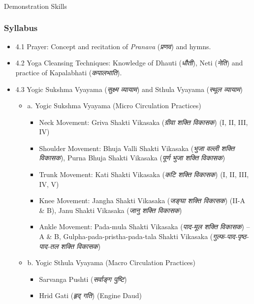 \begin{frame}[fragile]\frametitle{}
\begin{center}
{\Large Demonstration Skills}
\end{center}
\end{frame}

\begin{frame}[fragile]\frametitle{Syllabus}

\begin{itemize}
\item 4.1  Prayer: Concept and recitation of \textit{Pranava} (\textit{प्रणव}) and hymns. 
\item 4.2  Yoga Cleansing Techniques: Knowledge of Dhauti (\textit{धौती}), Neti (\textit{नेति}) and practice of Kapalabhati (\textit{कपालभाति}). 
\item 4.3  Yogic Sukshma Vyayama (\textit{सुक्ष्म व्यायाम}) and Sthula Vyayama (\textit{स्थूल व्यायाम})      
	\begin{itemize}
	\item a. Yogic Sukshma Vyayama (Micro Circulation Practices) 
		\begin{itemize}
		\item Neck Movement: Griva Shakti Vikasaka (\textit{ग्रीवा शक्ति विकासक}) (I, II, III, IV) 
		\item Shoulder Movement: Bhuja Valli Shakti Vikasaka (\textit{भुजा वल्ली शक्ति विकासक}), Purna Bhuja Shakti Vikasaka (\textit{पूर्ण भुजा शक्ति विकासक}) 
		\item Trunk Movement: Kati Shakti Vikasaka (\textit{कटि शक्ति विकासक}) (I, II, III, IV, V) 
		\item Knee Movement: Jangha Shakti Vikasaka (\textit{जङ्घा शक्ति विकासक}) (II-A \& B), Janu Shakti Vikasaka (\textit{जानु शक्ति विकासक})
		\item Ankle Movement: Pada-mula Shakti Vikasaka (\textit{पाद-मूल शक्ति विकासक}) – A \& B, Gulpha-pada-pristha-pada-tala Shakti Vikasaka (\textit{गुल्फ-पाद-पृष्ठ-पाद-तल शक्ति विकासक})
		\end{itemize}
	\item b. Yogic Sthula Vyayama (Macro Circulation Practices) 
		\begin{itemize}
		\item Sarvanga Pushti (\textit{सर्वाङ्ग पुष्टि})
		\item Hrid Gati (\textit{हृद् गति}) (Engine Daud)
		\end{itemize}
	\end{itemize}
\end{itemize}
\end{frame}


